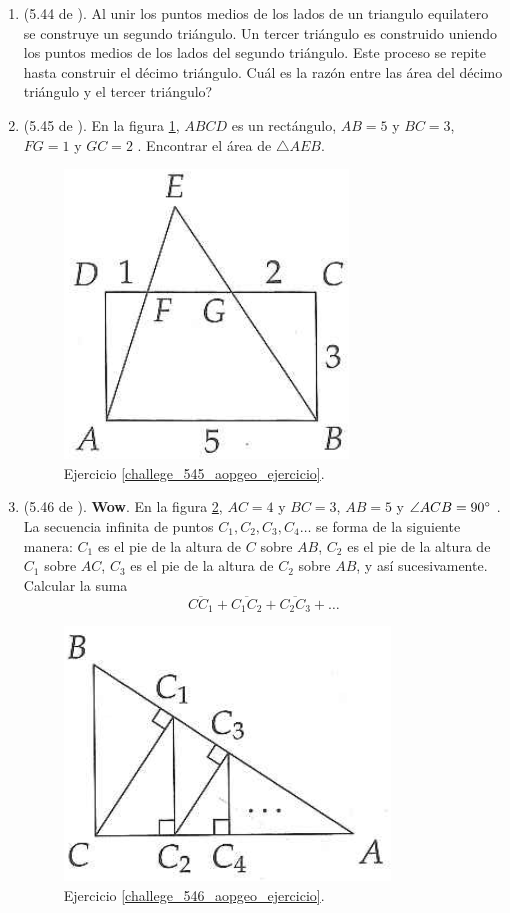 \begin{enumerate}
	\item \label{challege_544_aopgeo_ejercicio}(5.44 de \cite{Aops_Geometria}). Al unir los puntos medios de los lados de un triangulo equilatero se construye un segundo triángulo. Un tercer triángulo es construido uniendo los puntos medios de los lados del segundo triángulo. Este proceso se repite hasta construir el décimo triángulo. Cuál es la razón entre las área del décimo triángulo y el tercer triángulo?
	
	\item \label{challege_545_aopgeo_ejercicio}(5.45 de \cite{Aops_Geometria}). En la figura \ref{challege_545_aopgeo_ejer}, $ABCD$ es un rectángulo, $AB=5$ y $BC=3$, $FG=1$ y $GC=2$ . Encontrar el área de $\triangle AEB$.
	\begin{figure}[H]
		\centering
		\includegraphics[width=0.3\linewidth]{Geometria/imgs/challege_545_aopgeo_ejer}
		\caption{Ejercicio \ref{challege_545_aopgeo_ejercicio}.}
		\label{challege_545_aopgeo_ejer}
	\end{figure}

	\item \label{challege_546_aopgeo_ejercicio}(5.46 de \cite{Aops_Geometria}). \textbf{Wow}. En la figura \ref{challege_546_aopgeo_ejer}, $AC=4$ y $BC=3$, $AB=5$ y $\angle ACB=90\degree$ . La secuencia infinita de puntos $C_1,C_2,C_3,C_4\dots$ se forma de la siguiente manera: $C_1$ es el pie de la altura de $C$ sobre $AB$, $C_2$ es el pie de la altura de $C_1$ sobre $AC$, $C_3$ es el pie de la altura de $C_2$ sobre $AB$, y así sucesivamente. Calcular la suma
	\[
			\overline{CC_1} + \overline{C_1C_2}+ \overline{C_2C_3} + \dots 
	\]
	\begin{figure}[H]
		\centering
		\includegraphics[width=0.4\linewidth]{Geometria/imgs/challege_546_aopgeo_ejer}
		\caption{Ejercicio \ref{challege_546_aopgeo_ejercicio}.}
		\label{challege_546_aopgeo_ejer}
	\end{figure}


\end{enumerate}
